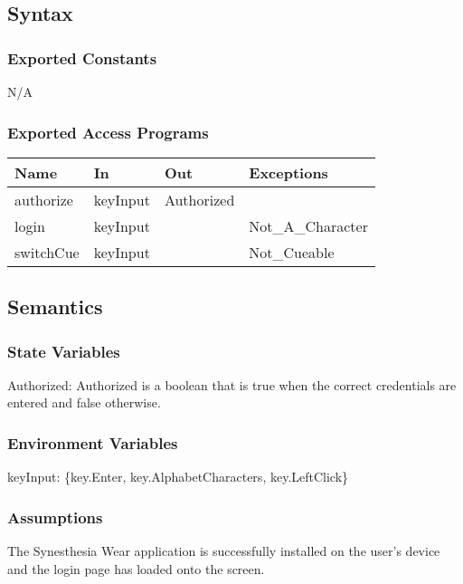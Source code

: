 \documentclass[12pt, titlepage]{article}
\begin{document}
\subsection{Syntax}

\subsubsection{Exported Constants}
N/A

\subsubsection{Exported Access Programs}

\begin{center}
\begin{tabular}{p{4cm} p{4cm} p{4cm} p{4cm}}
\hline
\textbf{Name} & \textbf{In} & \textbf{Out} & \textbf{Exceptions} \\
\hline
authorize & keyInput & Authorized & \\
\hline
login & keyInput &  & Not\_A\_Character \\
\hline
switchCue & keyInput &  & Not\_Cueable \\
\hline
\end{tabular}
\end{center}

\subsection{Semantics}

\subsubsection{State Variables}

Authorized: Authorized is a boolean that is true when the correct credentials are entered and false otherwise.

\subsubsection{Environment Variables}

keyInput: \{key.Enter, key.AlphabetCharacters, key.LeftClick\}

\subsubsection{Assumptions}

The Synesthesia Wear application is successfully installed on the user's device and the login page has loaded onto the screen. 
\end{document}
